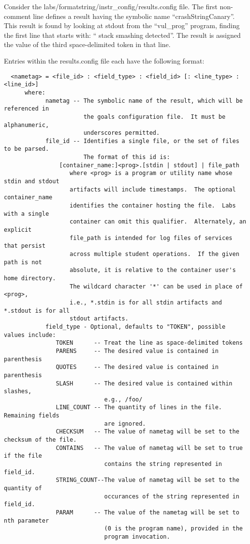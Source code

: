 \documentclass[12pt]{article}
\begin{document}
Consider the labs/formatstring/instr\_config/results.config file.  The first non-comment line
defines a result having the symbolic name ``crashStringCanary''.  This result is
found by looking at stdout from the ``vul\_prog'' program, finding the first line that starts with:
`` stack smashing detected''.  The result is assigned the value of the third space-delimited 
token in that line.

Entries within the results.config file each have the following format:

\begin{verbatim}
  <nametag> = <file_id> : <field_type> : <field_id> [: <line_type> : <line_id>]
      where:
            nametag -- The symbolic name of the result, which will be referenced in 
                       the goals configuration file.  It must be alphanumeric, 
                       underscores permitted.
            file_id -- Identifies a single file, or the set of files to be parsed.  
                       The format of this id is:
                [container_name:]<prog>.[stdin | stdout] | file_path
                   where <prog> is a program or utility name whose stdin and stdout 
                   artifacts will include timestamps.  The optional container_name 
                   identifies the container hosting the file.  Labs with a single 
                   container can omit this qualifier.  Alternately, an explicit 
                   file_path is intended for log files of services that persist 
                   across multiple student operations.  If the given path is not 
                   absolute, it is relative to the container user's home directory. 
                   The wildcard character '*' can be used in place of <prog>,
                   i.e., *.stdin is for all stdin artifacts and *.stdout is for all 
                   stdout artifacts.
            field_type - Optional, defaults to "TOKEN", possible values include:
               TOKEN      -- Treat the line as space-delimited tokens
               PARENS     -- The desired value is contained in parenthesis
               QUOTES     -- The desired value is contained in parenthesis
               SLASH      -- The desired value is contained within slashes, 
                             e.g., /foo/
               LINE_COUNT -- The quantity of lines in the file. Remaining fields 
                             are ignored.
               CHECKSUM   -- The value of nametag will be set to the checksum of the file.
               CONTAINS   -- The value of nametag will be set to true if the file 
                             contains the string represented in field_id.
               STRING_COUNT--The value of nametag will be set to the quantity of
                             occurances of the string represented in field_id.
               PARAM      -- The value of the nametag will be set to nth parameter
                             (0 is the program name), provided in the 
                             program invocation.  
                             

\end{verbatim}
\end{document}
